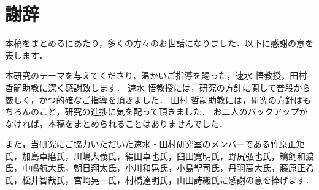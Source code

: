 \chapter*{謝辞}
本稿をまとめるにあたり，多くの方々のお世話になりました．以下に感謝の意を表します．

本研究のテーマを与えてくださり，温かいご指導を賜った，速水 悟教授，田村 哲嗣助教に深く感謝致します．
速水 悟教授には，研究の方針に関して普段から厳しく，かつ的確なご指導を頂きました．
田村 哲嗣助教には，研究の方針はもちろんのこと，研究の進捗に気を配って頂きました．
お二人のバックアップがなければ，本稿をまとめられることはありませんでした．

また，当研究にご協力いただいた速水・田村研究室のメンバーである竹原正矩氏，加島卓磨氏，川嶋大義氏，絹田卓也氏，臼田寛明氏，野尻弘也氏，鵜飼和渡氏，中嶋航大氏，朝日翔太氏，小川和晃氏，小島聖司氏，丹羽高大氏，藤原正希氏，松井智哉氏，宮崎晃一氏，村橋達明氏，山田詩織氏に感謝の意を捧げます．



